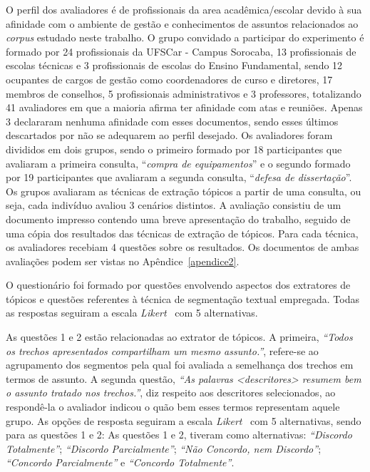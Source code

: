 O perfil dos avaliadores é de profissionais da area acadêmica/escolar devido à sua afinidade com o ambiente de gestão e conhecimentos de assuntos relacionados ao \textit{corpus} estudado neste trabalho. O grupo convidado a participar do experimento é formado por 24 profissionais da UFSCar - Campus Sorocaba, 13 profissionais de escolas técnicas e 3 profissionais de escolas do Ensino Fundamental, sendo 12 ocupantes de cargos de gestão como coordenadores de curso e diretores, 17 membros de conselhos, 5 profissionais administrativos e 3 professores, totalizando 41 avaliadores em que a maioria afirma ter afinidade com atas e reuniões. Apenas 3 declararam nenhuma afinidade com esses documentos, sendo esses últimos descartados por não se adequarem ao perfil desejado. Os avaliadores foram divididos em dois grupos, sendo o primeiro formado por 18 participantes que avaliaram a primeira consulta, ``\textit{compra de equipamentos}'' e o segundo formado por 19 participantes que avaliaram a segunda consulta, ``\textit{defesa de dissertação}''. Os grupos avaliaram as técnicas de extração tópicos a partir de uma consulta, ou seja, cada indivíduo avaliou 3 cenários distintos. A avaliação consistiu de um documento impresso contendo uma breve apresentação do trabalho, seguido de uma cópia dos resultados das técnicas de extração de tópicos. Para cada técnica, os avaliadores recebiam 4 questões sobre os resultados. Os documentos de ambas avaliações podem ser vistas no Apêndice~\ref{apendice2}.


O questionário foi formado por questões envolvendo aspectos dos extratores de tópicos e questões referentes à técnica de segmentação textual empregada.
Todas as respostas seguiram a escala \textit{Likert}~\cite{Norman2010} com 5 alternativas. 
%

As questões 1 e 2 estão relacionadas ao extrator de tópicos. 
A primeira, \textit{``Todos os trechos apresentados compartilham um mesmo assunto.''}, refere-se ao agrupamento dos segmentos pela qual foi avaliada a semelhança dos trechos em termos de assunto. 
A segunda questão, \textit{``As palavras \textit{<descritores>} resumem bem o assunto tratado nos trechos.''}, diz respeito aos descritores selecionados, ao respondê-la o avaliador indicou o quão bem esses termos representam aquele grupo.
As opções de resposta seguiram a escala \textit{Likert}~\cite{Norman2010} com 5 alternativas, sendo para as questões 1 e 2:
As questões 1 e 2, tiveram como alternativas: 
% 
		\textit{``Discordo Totalmente''}; 
		\textit{``Discordo Parcialmente''}; 
		\textit{``Não Concordo, nem Discordo''}; 
		\textit{``Concordo Parcialmente''} e 
		\textit{``Concordo Totalmente''}.  
%
%
%

